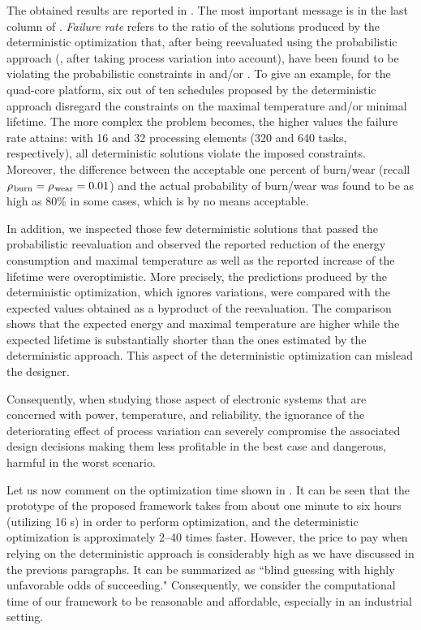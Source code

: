 The obtained results are reported in .
The most important message is in the last column of .
\emph{Failure rate} refers to the ratio of the solutions produced by the deterministic optimization that, after being reevaluated using the probabilistic approach (\ie, after taking process variation into account), have been found to be violating the probabilistic constraints in  and/or .
To give an example, for the quad-core platform, six out of ten schedules proposed by the deterministic approach disregard the constraints on the maximal temperature and/or minimal lifetime.
The more complex the problem becomes, the higher values the failure rate attains: with 16 and 32 processing elements (320 and 640 tasks, respectively), all deterministic solutions violate the imposed constraints.
Moreover, the difference between the acceptable one percent of burn/wear (recall $\rho_{\text{\kern0.1emburn}} = \rho_{\text{\kern0.1emwear}} = 0.01$) and the actual probability of burn/wear was found to be as high as 80\% in some cases, which is by no means acceptable.

In addition, we inspected those few deterministic solutions that passed the probabilistic reevaluation and observed the reported reduction of the energy consumption and maximal temperature as well as the reported increase of the lifetime were overoptimistic.
More precisely, the predictions produced by the deterministic optimization, which ignores variations, were compared with the expected values obtained as a byproduct of the reevaluation.
The comparison shows that the expected energy and maximal temperature are higher while the expected lifetime is substantially shorter than the ones estimated by the deterministic approach.
This aspect of the deterministic optimization can mislead the designer.

Consequently, when studying those aspect of electronic systems that are concerned with power, temperature, and reliability, the ignorance of the deteriorating effect of process variation can severely compromise the associated design decisions making them less profitable in the best case and dangerous, harmful in the worst scenario.

Let us now comment on the optimization time shown in .
It can be seen that the prototype of the proposed framework takes from about one minute to six hours (utilizing 16 s) in order to perform optimization, and the deterministic optimization is approximately 2--40 times faster.
However, the price to pay when relying on the deterministic approach is considerably high as we have discussed in the previous paragraphs.
It can be summarized as ``blind guessing with highly unfavorable odds of succeeding."
Consequently, we consider the computational time of our framework to be reasonable and affordable, especially in an industrial setting.


